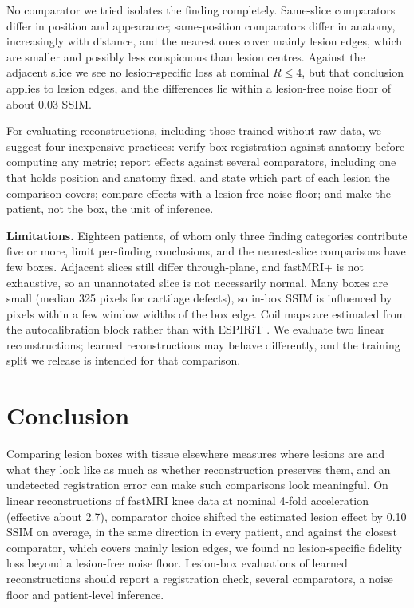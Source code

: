 \documentclass[letterpaper]{article} %
\begin{document}
No comparator we tried isolates the finding completely. Same-slice
comparators differ in position and appearance; same-position comparators
differ in anatomy, increasingly with distance, and the nearest ones cover
mainly lesion edges, which are smaller and possibly less conspicuous than
lesion centres. Against the adjacent slice we see no lesion-specific loss at
nominal $R\le4$, but that conclusion applies to lesion edges, and the
differences lie within a lesion-free noise floor of about 0.03 SSIM.

For evaluating reconstructions, including those trained without raw data, we
suggest four inexpensive practices: verify box registration against anatomy
before computing any metric; report effects against several comparators,
including one that holds position and anatomy fixed, and state which part of
each lesion the comparison covers; compare effects with a lesion-free noise
floor; and make the patient, not the box, the unit of inference.

\textbf{Limitations.} Eighteen patients, of whom only three finding
categories contribute five or more, limit per-finding conclusions, and the
nearest-slice comparisons have few boxes. Adjacent slices still differ
through-plane, and fastMRI+ is not exhaustive, so an unannotated slice is not
necessarily normal. Many boxes are small (median 325 pixels for cartilage
defects), so in-box SSIM is influenced by pixels within a few window widths of
the box edge. Coil maps are estimated from the autocalibration block rather
than with ESPIRiT \citep{uecker2014espirit}. We evaluate two linear
reconstructions; learned reconstructions \citep{hammernik2018variational} may
behave differently, and the training split we release is intended for that
comparison.

\section{Conclusion}

Comparing lesion boxes with tissue elsewhere measures where lesions are and
what they look like as much as whether reconstruction preserves them, and an
undetected registration error can make such comparisons look meaningful. On
linear reconstructions of fastMRI knee data at nominal 4-fold acceleration
(effective about 2.7), comparator choice shifted the estimated lesion effect
by 0.10 SSIM on average, in the same direction in every patient, and against the closest comparator, which
covers mainly lesion edges, we found no lesion-specific fidelity loss beyond
a lesion-free noise floor. Lesion-box evaluations of learned reconstructions
should report a registration check, several comparators, a noise floor and
patient-level inference.
\end{document}
